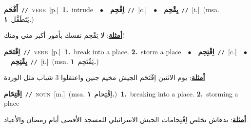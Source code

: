 \documentclass[10pt,a4paper,twoside]{article} %
\begin{document}
\begin{multicols}{2}
{\setlength\topsep{0pt}\textbf{\foreignlanguage{arabic}{أَقْحَم}}\ {\color{gray}\texttt{//}\color{black}}\ \textsc{verb}\ [p.]\ \textbf{1.}~intrude\ \ $\bullet$\ \ \setlength\topsep{0pt}\textbf{\foreignlanguage{arabic}{اِقْحِم}}\ {\color{gray}\texttt{//}\color{black}}\ [c.]\ \ $\bullet$\ \ \setlength\topsep{0pt}\textbf{\foreignlanguage{arabic}{يِقْحِم}}\ {\color{gray}\texttt{//}\color{black}}\ [i.]\ \color{gray}(msa. \foreignlanguage{arabic}{يَتَطَفَّل}~\foreignlanguage{arabic}{\textbf{١.}})\color{black}\  \begin{flushright}\color{gray}\foreignlanguage{arabic}{\textbf{\underline{\foreignlanguage{arabic}{أمثلة}}}: لا تِقْحِم نفسك بأمور أكبر مني ومنك!}\end{flushright}\color{black}} \vspace{2mm}

{\setlength\topsep{0pt}\textbf{\foreignlanguage{arabic}{اِقْتَحَم}}\ {\color{gray}\texttt{//}\color{black}}\ \textsc{verb}\ [p.]\ \textbf{1.}~break into a place.  \textbf{2.}~storm a place\ \ $\bullet$\ \ \setlength\topsep{0pt}\textbf{\foreignlanguage{arabic}{اِقْتِحِم}}\ {\color{gray}\texttt{//}\color{black}}\ [c.]\ \ $\bullet$\ \ \setlength\topsep{0pt}\textbf{\foreignlanguage{arabic}{يِقْتِحِم}}\ {\color{gray}\texttt{//}\color{black}}\ [i.]\ \color{gray}(msa. \foreignlanguage{arabic}{يَقْتَحِم}~\foreignlanguage{arabic}{\textbf{١.}})\color{black}\  \begin{flushright}\color{gray}\foreignlanguage{arabic}{\textbf{\underline{\foreignlanguage{arabic}{أمثلة}}}: يوم الاثنين اِقْتَحَم الجيش مخيم جنين واعتقلوا 3 شباب مثل الوردة}\end{flushright}\color{black}} \vspace{2mm}

{\setlength\topsep{0pt}\textbf{\foreignlanguage{arabic}{اِقْتِحَام}}\ {\color{gray}\texttt{//}\color{black}}\ \textsc{noun}\ [m.]\ \color{gray}(msa. \foreignlanguage{arabic}{اِقْتِحام}~\foreignlanguage{arabic}{\textbf{١.}})\color{black}\ \textbf{1.}~breaking into a place.  \textbf{2.}~storming a place\  \begin{flushright}\color{gray}\foreignlanguage{arabic}{\textbf{\underline{\foreignlanguage{arabic}{أمثلة}}}: بدهاش تخلص اِقْتِحامات الجيش الاسرائيلي للمسجد الأقصى أيام رمضان والأعياد}\end{flushright}\color{black}} \vspace{2mm}


\end{multicols}
\end{document}
